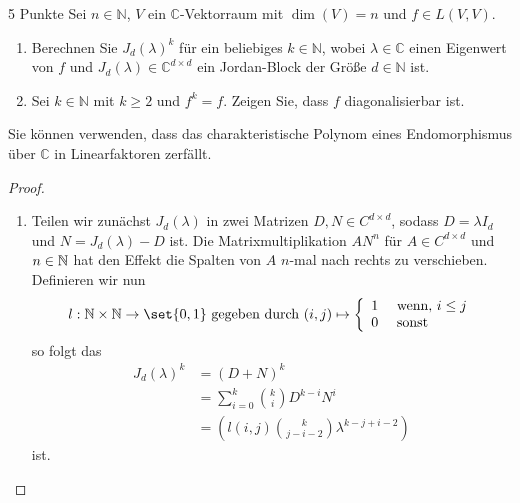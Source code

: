 \documentclass{problemset}
\begin{document}
\begin{problem}{5 Punkte}
Sei $n \in \mathbb{N}$, $V$ ein $\mathbb{C}$-Vektorraum mit $\dim(V) = n$ und $f \in L(V, V)$.
\begin{enumerate}
    \item Berechnen Sie $J_d(\lambda)^k$ für ein beliebiges $k \in \mathbb{N}$,
          wobei $\lambda \in \mathbb{C}$ einen Eigenwert von $f$ und
          $J_d(\lambda) \in \mathbb{C}^{d \times d}$ ein Jordan-Block der Größe
          $d \in \mathbb{N}$ ist.
    \item Sei $k \in \mathbb{N}$ mit $k \geq 2$ und $f^k = f$. Zeigen Sie, dass
          $f$ diagonalisierbar ist.
\end{enumerate}
\begin{hint}
    Sie können verwenden, dass das charakteristische Polynom eines Endomorphismus
    über $\mathbb{C}$ in Linearfaktoren zerfällt.
\end{hint}

\begin{proof}
    \leavevmode
    \begin{enumerate}
        \item Teilen wir zunächst \(J_d(\lambda)\) in zwei Matrizen \(D, N \in
              C^{d \times d}\), sodass \(D = \lambda I_d\) und \( N =
              J_d(\lambda) - D\) ist. Die Matrixmultiplikation \(A N^n\) für
              \(A \in C^{d \times d}\) und \(n \in \mathbb{N}\) hat den Effekt die
              Spalten von \(A\) \(n\)-mal nach rechts zu verschieben.
              Definieren wir nun
              \begin{equation*}
                  l : \nats \times \nats \rightarrow \set{0,1} \text{\ gegeben durch }
                  (i,j) \mapsto \left\{
                  \begin{array}{ll}
                      1 & \text{ wenn, } i \le j \\
                      0 & \text{ sonst}
                  \end{array}
                  \right.
              \end{equation*}
              so folgt das
              \begin{align*}
                  J_d(\lambda)^k & = {(D + N)}^k                                                \\
                                 & = \sum_{i=0}^k \binom{k}{i} D^{k-i} N^i                      \\
                                 & = \left(l(i,j) \binom{k}{j - i - 2} \lambda^{k-j+i-2}\right)
              \end{align*}
              ist.


\end{enumerate}
\end{proof}
\end{problem}
\end{document}
